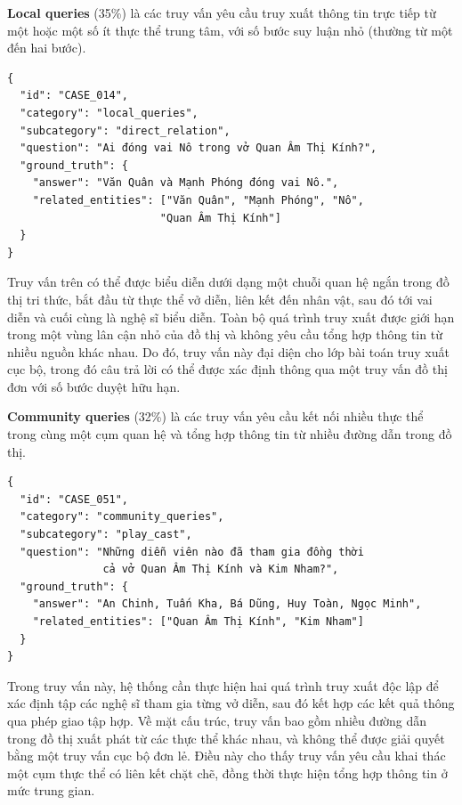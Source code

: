 \textbf{Local queries} (35\%) là các truy vấn yêu cầu truy xuất thông tin trực tiếp từ một hoặc một số ít thực thể trung tâm, với số bước suy luận nhỏ (thường từ một đến hai bước).

\begin{tcolorbox}[colback=gray!5, colframe=black!50, arc=4pt, boxrule=0.5pt]
{\small
\begin{verbatim}
{
  "id": "CASE_014",
  "category": "local_queries",
  "subcategory": "direct_relation",
  "question": "Ai đóng vai Nô trong vở Quan Âm Thị Kính?",
  "ground_truth": {
    "answer": "Văn Quân và Mạnh Phóng đóng vai Nô.",
    "related_entities": ["Văn Quân", "Mạnh Phóng", "Nô", 
                        "Quan Âm Thị Kính"]
  }
}
\end{verbatim}
}
\end{tcolorbox}
Truy vấn trên có thể được biểu diễn dưới dạng một chuỗi quan hệ ngắn trong đồ thị tri thức, bắt đầu từ thực thể vở diễn, liên kết đến nhân vật, sau đó tới vai diễn và cuối cùng là nghệ sĩ biểu diễn. Toàn bộ quá trình truy xuất được giới hạn trong một vùng lân cận nhỏ của đồ thị và không yêu cầu tổng hợp thông tin từ nhiều nguồn khác nhau. Do đó, truy vấn này đại diện cho lớp bài toán truy xuất cục bộ, trong đó câu trả lời có thể được xác định thông qua một truy vấn đồ thị đơn với số bước duyệt hữu hạn.

\textbf{Community queries} (32\%) là các truy vấn yêu cầu kết nối nhiều thực thể trong cùng một cụm quan hệ và tổng hợp thông tin từ nhiều đường dẫn trong đồ thị.

\begin{tcolorbox}[colback=gray!5, colframe=black!50, arc=4pt, boxrule=0.5pt]
{\small
\begin{verbatim}
{
  "id": "CASE_051",
  "category": "community_queries",
  "subcategory": "play_cast",
  "question": "Những diễn viên nào đã tham gia đồng thời 
               cả vở Quan Âm Thị Kính và Kim Nham?",
  "ground_truth": {
    "answer": "An Chinh, Tuấn Kha, Bá Dũng, Huy Toàn, Ngọc Minh",
    "related_entities": ["Quan Âm Thị Kính", "Kim Nham"]
  }
}
\end{verbatim}
}
\end{tcolorbox}
Trong truy vấn này, hệ thống cần thực hiện hai quá trình truy xuất độc lập để xác định tập các nghệ sĩ tham gia từng vở diễn, sau đó kết hợp các kết quả thông qua phép giao tập hợp. Về mặt cấu trúc, truy vấn bao gồm nhiều đường dẫn trong đồ thị xuất phát từ các thực thể khác nhau, và không thể được giải quyết bằng một truy vấn cục bộ đơn lẻ. Điều này cho thấy truy vấn yêu cầu khai thác một cụm thực thể có liên kết chặt chẽ, đồng thời thực hiện tổng hợp thông tin ở mức trung gian.

